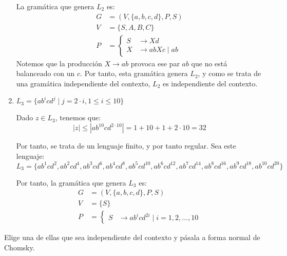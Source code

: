 \begin{ejercicio}
\begin{enumerate}
        La gramática que genera $L_2$ es:
        \begin{equation*}
            \begin{aligned}
                G &= (V,\{a,b,c,d\},P,S) \\
                V &= \{ S, A, B, C \} \\
                P &= \left\{
                    \begin{aligned}
                        S &\rightarrow Xd\\
                        X &\rightarrow abXc \mid ab
                    \end{aligned}
                \right.
            \end{aligned}
        \end{equation*}
        Notemos que la producción $X\rightarrow ab$ provoca ese par $ab$ que no está balanceado con un $c$. Por tanto, esta gramática genera $L_2$, y como se trata de una gramática independiente del contexto, $L_2$ es independiente del contexto.

        \item $L_3 = \{ ab^i cd^j \mid j = 2 \cdot i, 1 \leq i \leq 10 \}$
        
        Dado $z\in L_3$, tenemos que:
        \begin{equation*}
            |z|\leq |ab^{10}cd^{2\cdot 10}|=1+10+1+2\cdot 10=32
        \end{equation*}

        Por tanto, se trata de un lenguaje finito, y por tanto regular. Sea este lenguaje:
        \begin{equation*}
            L_3=\{ab^1cd^2, ab^2cd^4, ab^3cd^6, ab^4cd^8, ab^5cd^{10}, ab^6cd^{12}, ab^7cd^{14}, ab^8cd^{16}, ab^9cd^{18}, ab^{10}cd^{20}\}
        \end{equation*}

        Por tanto, la gramática que genera $L_3$ es:
        \begin{equation*}
            \begin{aligned}
                G &= (V,\{a,b,c,d\},P,S) \\
                V &= \{ S \} \\
                P &= \left\{
                    \begin{aligned}
                        S &\rightarrow ab^icd^{2i} \mid i=1,2,\ldots,10
                    \end{aligned}
                \right.
            \end{aligned}
        \end{equation*}
    \end{enumerate}
    Elige una de ellas que sea independiente del contexto y pásala a forma normal de Chomsky.\\


\end{ejercicio}

